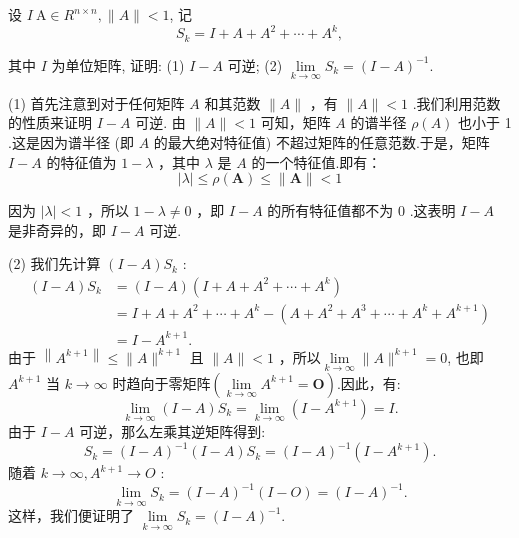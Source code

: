 \begin{tcolorbox}[enhanced,colback=10,colframe=9,breakable,coltitle=green!25!black,title=2024]
  
设 $ I \mathrm{~A} \in R^{n \times n},\|A\|<1 $, 记
$$
S_{k}=I+A+A^{2}+\cdots+A^{k},
$$

其中 $ I $ 为单位矩阵, 证明:
(1) $ I-A $ 可逆;
(2) $ \lim\limits _{k \rightarrow \infty} S_{k}=(I-A)^{-1} $.
\tcblower

(1) 首先注意到对于任何矩阵 $ A $ 和其范数 $ \|A\| $ ，有 $ \|A\|<1 $ .我们利用范数的性质来证明 $ I-A $ 可逆.
由 $ \|A\|<1 $ 可知，矩阵 $ A $ 的谱半径 $ \rho(A) $ 也小于 1 .这是因为谱半径 (即 $ A $ 的最大绝对特征值) 不超过矩阵的任意范数.于是，矩阵 $ I-A $ 的特征值为 $ 1-\lambda $ ，其中 $ \lambda $ 是 $ A $ 的一个特征值.即有：
 $$ \left|\lambda\right| \leqslant \rho(\boldsymbol{A}) \leqslant\|\boldsymbol{A}\|<1 $$

因为 $ |\lambda|<1 $ ，所以 $ 1-\lambda \neq 0 $ ，即 $ I-A $ 的所有特征值都不为 0 .这表明 $ I-A $ 是非奇异的，即 $ I-A $ 可逆.

(2) 我们先计算 $ (I-A) S_{k} $ :
$$
\begin{aligned}
(I-A) S_{k} & =(I-A)\left(I+A+A^{2}+\cdots+A^{k}\right) \\
& =I+A+A^{2}+\cdots+A^{k}-\left(A+A^{2}+A^{3}+\cdots+A^{k}+A^{k+1}\right) \\
& =I-A^{k+1} .
\end{aligned}
$$
由于 $ \left\|A^{k+1}\right\| \leq\|A\|^{k+1} $ 且 $ \|A\|<1 $ ，所以$\lim\limits_{k\to\infty}\|A\|^{k+1}=0 $, 也即$ A^{k+1} $ 当 $ k \rightarrow \infty $ 时趋向于零矩阵$(\lim\limits_{k\to\infty}A^{k+1}=\boldsymbol{O} )$.因此，有:
$$
\lim _{k \rightarrow \infty}(I-A) S_{k}=\lim _{k \rightarrow \infty}(I-A^{k+1})=I .
$$
由于 $ I-A $ 可逆，那么左乘其逆矩阵得到:
$$
S_{k}=(I-A)^{-1}(I-A) S_{k}=(I-A)^{-1}\left(I-A^{k+1}\right) .
$$
随着 $ k \rightarrow \infty, A^{k+1} \rightarrow O$ :
$$
\lim _{k \rightarrow \infty} S_{k}=(I-A)^{-1}(I-O)=(I-A)^{-1} .
$$
这样，我们便证明了 $\lim\limits _{k \rightarrow \infty} S_{k}=(I-A)^{-1} $.
\end{tcolorbox}







